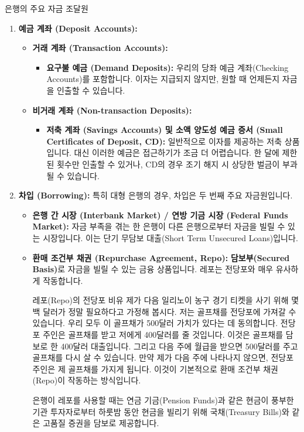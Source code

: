 \documentclass[11pt,a4paper]{article}
\theoremstyle{definition}
\begin{document}
\begin{summarybox}{은행의 주요 자금 조달원}
\begin{enumerate}
    \item \textbf{예금 계좌 (Deposit Accounts):}
    \begin{itemize}
        \item \textbf{거래 계좌 (Transaction Accounts):}
        \begin{itemize}
            \item \textbf{요구불 예금 (Demand Deposits):} 우리의 당좌 예금 계좌(Checking Accounts)를 포함합니다. 이자는 지급되지 않지만, 원할 때 언제든지 자금을 인출할 수 있습니다.
        \end{itemize}
        \item \textbf{비거래 계좌 (Non-transaction Deposits):}
        \begin{itemize}
            \item \textbf{저축 계좌 (Savings Accounts) 및 소액 양도성 예금 증서 (Small Certificates of Deposit, CD):} 일반적으로 이자를 제공하는 저축 상품입니다. 대신 이러한 예금은 접근하기가 조금 더 어렵습니다. 한 달에 제한된 횟수만 인출할 수 있거나, CD의 경우 조기 해지 시 상당한 벌금이 부과될 수 있습니다.
        \end{itemize}
    \end{itemize}

    \item \textbf{차입 (Borrowing):}
    특히 대형 은행의 경우, 차입은 두 번째 주요 자금원입니다.
    \begin{itemize}
        \item \textbf{은행 간 시장 (Interbank Market) / 연방 기금 시장 (Federal Funds Market):} 자금 부족을 겪는 한 은행이 다른 은행으로부터 자금을 빌릴 수 있는 시장입니다. 이는 단기 무담보 대출(Short Term Unsecured Loans)입니다.
        \item \textbf{환매 조건부 채권 (Repurchase Agreement, Repo):} \textbf{담보부(Secured Basis)}로 자금을 빌릴 수 있는 금융 상품입니다. 레포는 전당포와 매우 유사하게 작동합니다.
        \begin{examplebox}{레포(Repo)의 전당포 비유}
        제가 다음 일리노이 농구 경기 티켓을 사기 위해 몇백 달러가 정말 필요하다고 가정해 봅시다. 저는 골프채를 전당포에 가져갈 수 있습니다. 우리 모두 이 골프채가 500달러 가치가 있다는 데 동의합니다. 전당포 주인은 골프채를 받고 저에게 400달러를 줄 것입니다. 이것은 골프채를 담보로 한 400달러 대출입니다. 그리고 다음 주에 월급을 받으면 500달러를 주고 골프채를 다시 살 수 있습니다. 만약 제가 다음 주에 나타나지 않으면, 전당포 주인은 제 골프채를 가지게 됩니다. 이것이 기본적으로 환매 조건부 채권(Repo)이 작동하는 방식입니다.
        \end{examplebox}
        은행이 레포를 사용할 때는 연금 기금(Pension Funds)과 같은 현금이 풍부한 기관 투자자로부터 하룻밤 동안 현금을 빌리기 위해 국채(Treasury Bills)와 같은 고품질 증권을 담보로 제공합니다.


\end{itemize}
\end{enumerate}
\end{summarybox}
\end{document}
